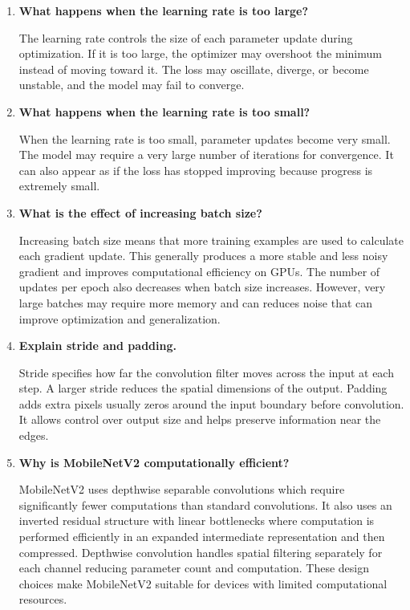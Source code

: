 \documentclass[10pt]{article}
\begin{document}
\begin{enumerate}
\item \textbf{What happens when the learning rate is too large?}

\vspace{5mm}
The learning rate controls the size of each parameter update during optimization. 
If it is too large, the optimizer may overshoot the minimum instead of moving toward it. 
The loss may oscillate, diverge, or become unstable, and the model may fail to converge.
\vspace{3mm}

\item \textbf{What happens when the learning rate is too small?}

\vspace{5mm}
When the learning rate is too small, parameter updates become very small. 
The model may require a very large number of iterations for convergence.
It can also appear as if the loss has stopped improving because progress is extremely small.
\vspace{3mm}

\item \textbf{What is the effect of increasing batch size?}

\vspace{5mm}
Increasing batch size means that more training examples are used to calculate each gradient update. 
This generally produces a more stable and less noisy gradient and improves computational efficiency on GPUs.
The number of updates per epoch also decreases when batch size increases.
However, very large batches may require more memory and can reduces noise that can improve optimization and generalization. 
\vspace{3mm}

\item \textbf{Explain stride and padding.}

\vspace{5mm}
Stride specifies how far the convolution filter moves across the input at each step. 
A larger stride reduces the spatial dimensions of the output. 
Padding adds extra pixels usually zeros around the input boundary before convolution.
It allows control over output size and helps preserve information near the edges. 
\vspace{3mm}

\item \textbf{Why is MobileNetV2 computationally efficient?}

\vspace{5mm}
MobileNetV2 uses depthwise separable convolutions which require significantly fewer computations than standard convolutions. 
It also uses an inverted residual structure with linear bottlenecks where computation is performed efficiently in an expanded intermediate representation and then compressed. 
Depthwise convolution handles spatial filtering separately for each channel reducing parameter count and computation. 
These design choices make MobileNetV2 suitable for devices with limited computational resources. 
\vspace{3mm}


\end{enumerate}
\end{document}
